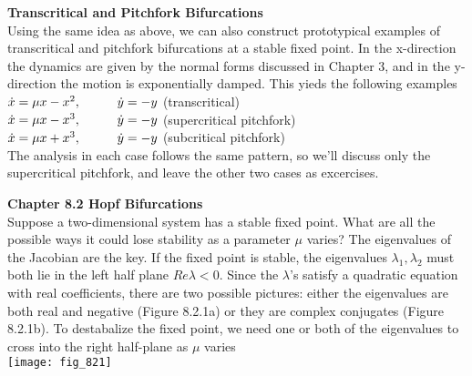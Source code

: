 \documentclass{article}
\newcommand\tab[1][1cm]{\hspace*{#1}}
\begin{document}
\textbf {Transcritical and Pitchfork Bifurcations} \\ \tab
Using the same idea as above, we can also construct prototypical examples of transcritical and pitchfork bifurcations at a stable fixed point. In the x-direction the dynamics are given by the normal forms discussed in Chapter 3, and in the y-direction the motion is exponentially damped. This yieds the following examples \\ \tab \tab
$\dot{x}=\mu x- x^{2}, \tab \dot{y}=-y$ (transcritical) \\ \tab \tab
$\dot{x}=\mu x-x^{3}, \tab \dot{y}=-y$ (supercritical pitchfork) \\ \tab \tab
$\dot{x}=\mu x + x^{3}, \tab \dot{y}=-y$ (subcritical pitchfork) \\ 

The analysis in each case follows the same pattern, so we'll discuss only the supercritical pitchfork, and leave the other two cases as excercises.

\textbf {Chapter 8.2 Hopf Bifurcations} \\
Suppose a two-dimensional system has a stable fixed point. What are all the possible ways it could lose stability as a parameter $\mu$ varies?  The eigenvalues of the Jacobian are the key. If the fixed point is stable, the eigenvalues $\lambda_{1}, \lambda_{2}$ must both lie in the left half plane $Re \lambda<0$. Since the $\lambda$'s satisfy a quadratic equation with real coefficients, there are two possible pictures: either the eigenvalues are both real and negative (Figure 8.2.1a) or they are complex conjugates (Figure 8.2.1b). To destabalize the fixed point, we need one or both of the eigenvalues to cross into the right half-plane as $\mu$ varies \\
\texttt{[image: fig\_821]}
\end{document}
